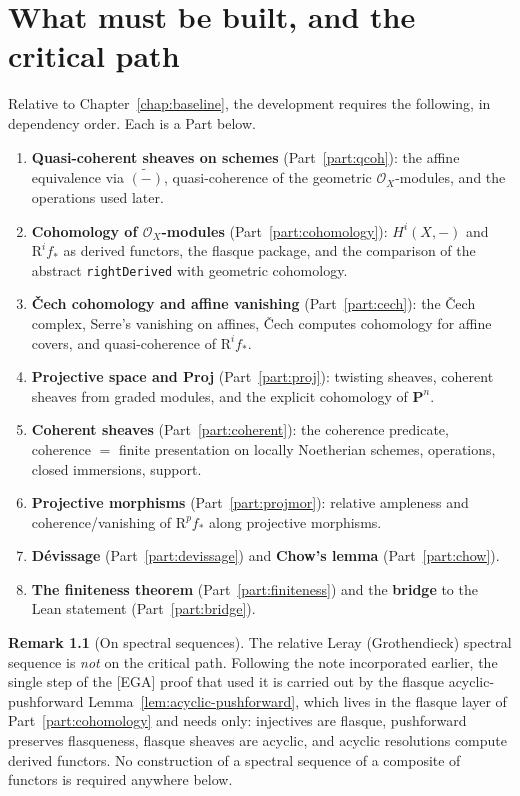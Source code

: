 \documentclass[11pt]{report}
\theoremstyle{plain}
\theoremstyle{definition}
\newtheorem{remark}[theorem]{Remark}
\newcommand{\Oo}{\mathcal{O}}
\newcommand{\PP}{\mathbf{P}}
\newcommand{\Rr}{\mathrm{R}}
\begin{document}
\chapter{What must be built, and the critical path}\label{chap:gaps}

Relative to Chapter~\ref{chap:baseline}, the development requires the
following, in dependency order. Each is a Part below.
\begin{enumerate}[leftmargin=1.6em]
\item \textbf{Quasi-coherent sheaves on schemes} (Part~\ref{part:qcoh}): the
affine equivalence via $\widetilde{(-)}$, quasi-coherence of the geometric
$\Oo_X$-modules, and the operations used later.
\item \textbf{Cohomology of $\Oo_X$-modules} (Part~\ref{part:cohomology}):
$H^i(X,-)$ and $\Rr^i f_*$ as derived functors, the flasque package, and the
comparison of the abstract \texttt{rightDerived} with geometric cohomology.
\item \textbf{\v{C}ech cohomology and affine vanishing} (Part~\ref{part:cech}):
the \v{C}ech complex, Serre's vanishing on affines, \v{C}ech computes
cohomology for affine covers, and quasi-coherence of $\Rr^i f_*$.
\item \textbf{Projective space and Proj} (Part~\ref{part:proj}): twisting
sheaves, coherent sheaves from graded modules, and the explicit cohomology of
$\PP^n$.
\item \textbf{Coherent sheaves} (Part~\ref{part:coherent}): the coherence
predicate, coherence $=$ finite presentation on locally Noetherian schemes,
operations, closed immersions, support.
\item \textbf{Projective morphisms} (Part~\ref{part:projmor}): relative
ampleness and coherence/vanishing of $\Rr^p f_*$ along projective morphisms.
\item \textbf{D\'evissage} (Part~\ref{part:devissage}) and \textbf{Chow's
lemma} (Part~\ref{part:chow}).
\item \textbf{The finiteness theorem} (Part~\ref{part:finiteness}) and the
\textbf{bridge} to the Lean statement (Part~\ref{part:bridge}).
\end{enumerate}

\begin{remark}[On spectral sequences]\label{rem:no-ss}
The relative Leray (Grothendieck) spectral sequence is \emph{not} on the
critical path. Following the note \cite{Note} incorporated earlier, the single
step of the [EGA] proof that used it is carried out by the flasque
acyclic-pushforward Lemma~\ref{lem:acyclic-pushforward}, which lives in the
flasque layer of Part~\ref{part:cohomology} and needs only: injectives are
flasque, pushforward preserves flasqueness, flasque sheaves are acyclic, and
acyclic resolutions compute derived functors. No construction of a spectral
sequence of a composite of functors is required anywhere below.
\end{remark}
\end{document}
